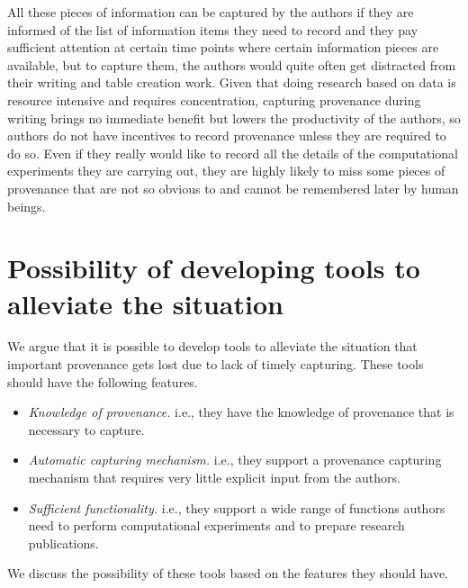 All these pieces of information can be captured by the authors if they are informed of the list of 
information items they need to record and they pay sufficient attention at certain time points where 
certain information pieces are available, but to capture them, the authors would quite often get 
distracted from their writing and table creation work. Given that doing research based on data is 
resource intensive and requires concentration, capturing provenance during writing brings no 
immediate benefit but lowers the productivity of the authors, so authors do not have incentives to 
record provenance unless they are required to do so. Even if they really would like to record all the 
details of the computational experiments they are carrying out, they are highly likely to miss some 
pieces of provenance that are not so obvious to and cannot be remembered later by human beings. 


\section{Possibility of developing tools to alleviate the situation}
We argue that it is possible to develop tools to alleviate the situation that important provenance gets lost due to lack of timely capturing. These tools should have the following features.
\begin{itemize}
\item \emph{Knowledge of provenance.} i.e., they have the knowledge of provenance that is necessary to capture.
\item \emph{Automatic capturing mechanism.} i.e., they support a provenance capturing mechanism that requires very little explicit input from the authors.
\item \emph{Sufficient functionality.} i.e., they support a wide range of functions authors need to perform computational experiments and to prepare research publications.
\end{itemize}
We discuss the possibility of these tools based on the features they should have.


